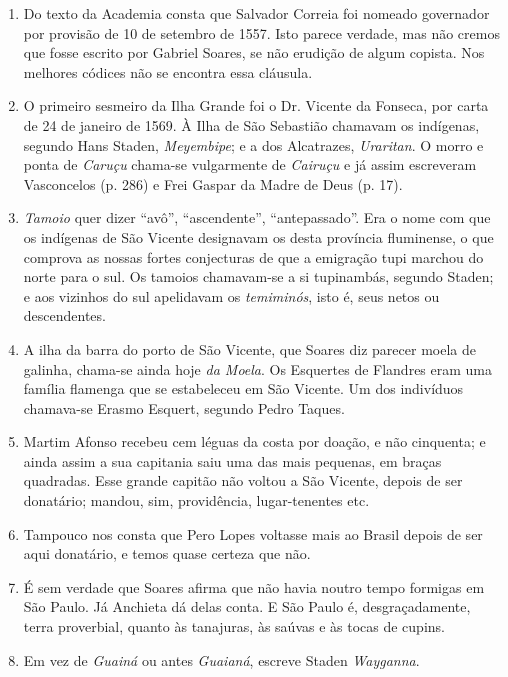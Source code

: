 \begin{enumerate}
\item Do texto da Academia consta que Salvador Correia foi nomeado governador por 
provisão de 10 de setembro de 1557. Isto parece verdade, mas não cremos que fosse 
escrito por Gabriel Soares, se não erudição de algum copista. Nos melhores códices 
não se encontra essa cláusula.

\item O primeiro sesmeiro da Ilha Grande foi o Dr. Vicente da Fonseca, por carta de 24 de 
janeiro de 1569.
À Ilha de São Sebastião chamavam os indígenas, segundo Hans Staden, \textit{Meyembipe}; 
e a dos Alcatrazes, \textit{Uraritan}.
O morro e ponta de \textit{Caruçu} chama-se vulgarmente de \textit{Cairuçu} e já assim escreveram 
Vasconcelos (p. 286) e Frei Gaspar da Madre de Deus (p. 17).

\item  \textit{Tamoio} quer dizer ``avô'', ``ascendente'', ``antepassado''.  Era o nome
com que os indígenas de São Vicente designavam os desta província fluminense, 
o que comprova as nossas fortes conjecturas de que a emigração tupi marchou 
do norte para o sul. Os tamoios chamavam-se a si tupinambás, segundo Staden; e 
aos vizinhos do sul apelidavam os \textit{temiminós}, isto é, seus netos ou descendentes.

\item  A ilha da barra do porto de São Vicente, que Soares diz parecer
moela de galinha, chama-se ainda hoje \textit{da Moela}.
Os Esquertes de Flandres eram uma família flamenga que se estabeleceu em São 
Vicente. Um dos indivíduos chamava-se Erasmo Esquert, segundo Pedro Taques.

\item Martim Afonso recebeu cem léguas da costa por doação, e não cinquenta; e ainda 
assim a sua capitania saiu uma das mais pequenas, em braças quadradas. Esse grande 
capitão não voltou a São Vicente, depois de ser donatário; mandou, sim, providência, 
lugar-tenentes etc.

\item Tampouco nos consta que Pero Lopes voltasse mais ao Brasil depois de ser aqui 
donatário, e temos quase certeza que não.

\item É sem verdade que Soares afirma que não havia noutro tempo formigas em São 
Paulo. Já Anchieta dá delas conta. E São Paulo é, desgraçadamente, terra proverbial, 
quanto às tanajuras, às saúvas e às tocas de cupins.

\item Em vez de \textit{Guainá} ou antes \textit{Guaianá}, escreve Staden \textit{Wayganna}.


\end{enumerate}
